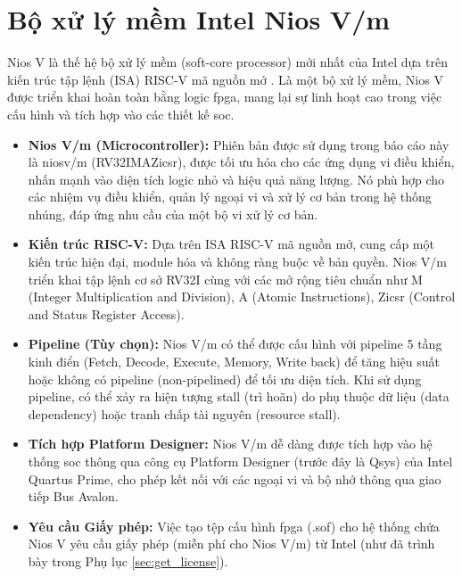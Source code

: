 \section{Bộ xử lý mềm Intel Nios V/m}
Nios V là thế hệ bộ xử lý mềm (soft-core processor) mới nhất của Intel dựa trên kiến trúc tập lệnh (ISA) RISC-V mã nguồn mở \cite{intelNiosVHandbook}. Là một bộ xử lý mềm, Nios V được triển khai hoàn toàn bằng logic \acrshort{fpga}, mang lại sự linh hoạt cao trong việc cấu hình và tích hợp vào các thiết kế \acrshort{soc}.
\begin{itemize}
    \item \textbf{Nios V/m (Microcontroller):} Phiên bản được sử dụng trong báo cáo này là \acrshort{niosv}/m (RV32IMAZicsr), được tối ưu hóa cho các ứng dụng vi điều khiển, nhấn mạnh vào diện tích logic nhỏ và hiệu quả năng lượng. Nó phù hợp cho các nhiệm vụ điều khiển, quản lý ngoại vi và xử lý cơ bản trong hệ thống nhúng, đáp ứng nhu cầu của một bộ vi xử lý cơ bản.
    \item \textbf{Kiến trúc RISC-V:} Dựa trên ISA RISC-V mã nguồn mở, cung cấp một kiến trúc hiện đại, module hóa và không ràng buộc về bản quyền. Nios V/m triển khai tập lệnh cơ sở RV32I cùng với các mở rộng tiêu chuẩn như M (Integer Multiplication and Division), A (Atomic Instructions), Zicsr (Control and Status Register Access).
    \item \textbf{Pipeline (Tùy chọn):} Nios V/m có thể được cấu hình với pipeline 5 tầng kinh điển (Fetch, Decode, Execute, Memory, Write back) để tăng hiệu suất hoặc không có pipeline (non-pipelined) để tối ưu diện tích. Khi sử dụng pipeline, có thể xảy ra hiện tượng stall (trì hoãn) do phụ thuộc dữ liệu (data dependency) hoặc tranh chấp tài nguyên (resource stall).
    \item \textbf{Tích hợp Platform Designer:} Nios V/m dễ dàng được tích hợp vào hệ thống \acrshort{soc} thông qua công cụ Platform Designer (trước đây là Qsys) của Intel Quartus Prime, cho phép kết nối với các ngoại vi và bộ nhớ thông qua giao tiếp Bus Avalon.
    \item \textbf{Yêu cầu Giấy phép:} Việc tạo tệp cấu hình \acrshort{fpga} (.sof) cho hệ thống chứa Nios V yêu cầu giấy phép (miễn phí cho Nios V/m) từ Intel (như đã trình bày trong Phụ lục \ref{sec:get_license}).
\end{itemize}

